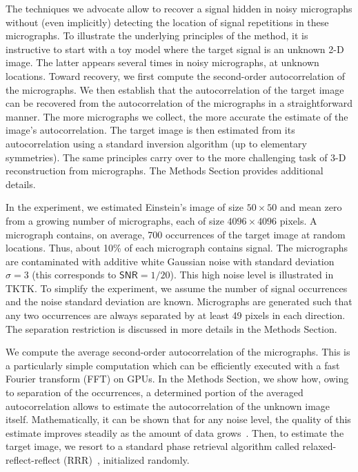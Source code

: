 \documentclass[english,11pt]{article}
\newcommand{\1}{\mathbf{1}}
\newcommand{\TODO}[1]{{\color{red}{[#1]}}}
\numberwithin{equation}{section}
\theoremstyle{plain}
\theoremstyle{definition}
\theoremstyle{remark}
\theoremstyle{plain}
\theoremstyle{remark}
\theoremstyle{plain}
\theoremstyle{plain}
\newcommand{\SNR}{\ensuremath{\textsf{SNR}}}
\begin{document}
The techniques we advocate allow to recover a signal hidden in noisy micrographs without (even implicitly) detecting the location of signal repetitions in these micrographs. To illustrate the underlying principles of the method, it is instructive to start with a toy model where the target signal is an unknown 2-D image. The latter appears several times in noisy micrographs, at unknown locations. Toward recovery, we first compute the second-order autocorrelation of the micrographs. We then establish that the autocorrelation of the target image can be recovered from the autocorrelation of the micrographs in a straightforward manner. The more micrographs we collect, the more accurate the estimate of the image's autocorrelation. 
The target image is then estimated from its autocorrelation using a standard inversion algorithm (up to elementary symmetries).
The same principles carry over to the more challenging task of 3-D reconstruction from micrographs.
The Methods Section provides additional details. 

In the  experiment, we estimated Einstein's image of size $50\times 50$ and mean zero from a growing number of micrographs, each of size $4096\times 4096$ pixels. A micrograph contains, on average, 700 occurrences of the target image at random locations. 
Thus, about 10\% of each micrograph contains signal. The micrographs are contaminated with additive white Gaussian noise with standard deviation $\sigma=3$ (this corresponds to $\SNR=1/20$). This high noise level is illustrated in TKTK. %
To simplify the experiment, we assume the number of signal occurrences and the noise standard deviation are known. Micrographs are generated such that any two occurrences are always separated by at least 49 pixels in each direction. The separation restriction is discussed in more details in the Methods Section.

We compute the average second-order autocorrelation of the micrographs. This is a particularly simple computation which can be efficiently executed with a fast Fourier transform (FFT) on GPUs. In the Methods Section, we show how, owing to separation of the occurrences, a determined portion of the averaged autocorrelation allows to estimate the autocorrelation of the unknown image itself. Mathematically, it can be shown that for any noise level, the quality of this estimate improves steadily as the amount of data grows~\cite{bendory2018estimation}. Then, to estimate the target image, we resort to a standard phase retrieval algorithm called relaxed-reflect-reflect (RRR)~\cite{elser2017rrr}, initialized randomly.
\end{document}
